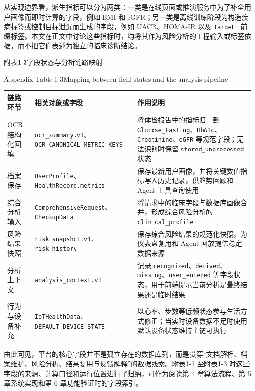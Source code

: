 \documentclass[UTF8, a4paper, 12pt, oneside]{ctexrep}
\numberwithin{equation}{chapter}
\newcommand{\codeid}[1]{{\begingroup\urlstyle{rm}\nolinkurl{#1}\endgroup}}
\begin{document}
{\vspace{\baselineskip}
从实现边界看，派生指标可以分为两类：一类是在线页面或推演服务中为了补全用户画像而即时计算的字段，例如 BMI 和 eGFR；另一类是离线训练阶段为构造疾病标签或控制目标泄漏而生成的字段，例如 UACR、HOMA-IR 以及 \codeid{Target_} 前缀标签。本文在正文中讨论这些指标时，均将其作为风险分析的工程输入或标签依据，而不把它们表述为独立的临床诊断结论。

\vspace{0.5\baselineskip}
\begin{center}
{\songti{}附表1-3\quad 字段状态与分析链路映射\par}
{\rmfamily{}Appendix Table 1-3\quad Mapping between field states and the analysis pipeline\par}
\end{center}
\vspace{-0.5\baselineskip}
{\songti{}
\noindent\begin{tabular}{@{}>{\raggedright\arraybackslash}p{} >{\raggedright\arraybackslash}p{} >{\raggedright\arraybackslash}p{}@{}}
\toprule
链路环节 & 相关对象或字段 & 作用说明 \\
\midrule
OCR 结构化回填 & \codeid{ocr_summary.v1}、\codeid{OCR_CANONICAL_METRIC_KEYS} & 将体检报告中的指标归一到 \codeid{Glucose_Fasting}、\codeid{HbA1c}、\codeid{Creatinine}、\codeid{eGFR} 等规范字段；无法识别时保留 \codeid{stored_unprocessed} 状态 \\
档案保存 & \codeid{UserProfile}、\codeid{HealthRecord.metrics} & 保存最新用户画像，并将关键数值指标写入历史记录，供趋势回顾和 Agent 工具查询使用 \\
综合分析输入 & \codeid{ComprehensiveRequest}、\codeid{CheckupData} & 将请求中的临床字段与数据库画像合并，形成综合风险分析的 \codeid{clinical_profile} \\
风险结果快照 & \codeid{risk_snapshot.v1}、\codeid{risk_history} & 保存综合风险结果的规范化快照，为仪表盘复用和 Agent 回放提供稳定数据来源 \\
分析上下文 & \codeid{analysis_context.v1} & 记录 \codeid{recognized}、\codeid{derived}、\codeid{missing}、\codeid{user_entered} 等字段状态，用于前端提示当前分析是最终结果还是临时结果 \\
行为与设备补充 & \codeid{IoTHealthData}、\codeid{DEFAULT_DEVICE_STATE} & 以心率、步数等低频状态参与生活方式修正；当实时设备数据不足时使用默认设备状态维持主链可执行 \\
\bottomrule
\end{tabular}
}

\vspace{\baselineskip}
由此可见，平台的核心字段并不是孤立存在的数据库列，而是贯穿“文档解析、档案维护、风险分析、结果复用与反馈解释”的数据线索。附表1-1 至附表1-3 对这些字段的来源、计算口径和运行位置进行了归纳，可作为阅读第 4 章算法流程、第 5 章系统实现和第 6 章功能验证时的字段索引。
\par}
\clearpage
\end{document}
